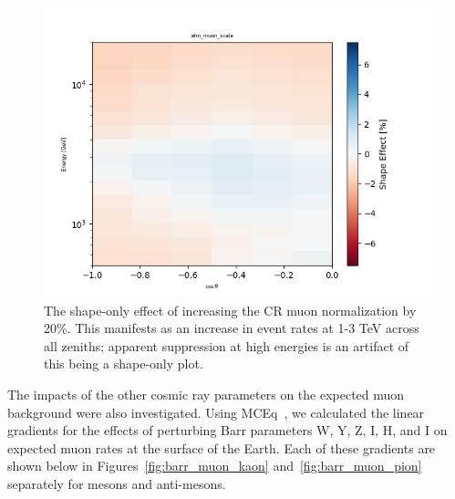 \documentclass[main.tex]{subfiles}
\begin{document}
\begin{figure}
    \centering
    \includegraphics[width=0.8\linewidth]{figures/atm_muon_scale.png}
    \caption{The shape-only effect of increasing the CR muon normalization by 20\%. This manifests as an increase in event rates at 1-3 TeV across all zeniths; apparent suppression at high energies is an artifact of this being a shape-only plot.}\label{fig:muon_shape}
\end{figure}

The impacts of the other cosmic ray parameters on the expected muon background were also investigated. 
Using MCEq~\cite{fedynitch2015calculation}, we calculated the linear gradients for the effects of perturbing Barr parameters W, Y, Z, I, H, and I on expected muon rates at the surface of the Earth. 
Each of these gradients are shown below in Figures~\ref{fig:barr_muon_kaon} and~\ref{fig:barr_muon_pion} separately for mesons and anti-mesons.
\end{document}
